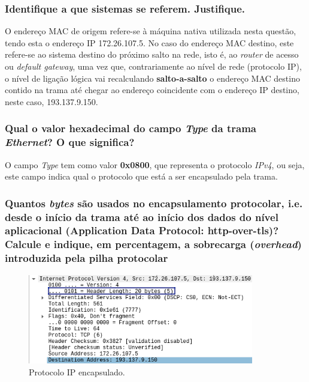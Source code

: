 \subsubsection{Identifique a que sistemas se referem. Justifique.}

    \par O endereço MAC de origem refere-se à máquina nativa utilizada nesta questão, tendo esta o endereço IP 172.26.107.5. No caso do endereço MAC destino, este refere-se ao sistema destino do próximo salto na rede, isto é, ao \textit{router} de acesso ou \textit{default gateway}, uma vez que, contrariamente ao nível de rede (protocolo IP), o nível de ligação lógica vai recalculando \textbf{salto-a-salto} o endereço MAC destino contido na trama até chegar ao endereço coincidente com o endereço IP destino, neste caso, 193.137.9.150.




\paragraph{}
\subsubsection{Qual o valor hexadecimal do campo \textit{Type} da trama \textit{Ethernet}? O que significa?}

    \par O campo \textit{Type} tem como valor \textbf{0x0800}, que representa o protocolo \textit{IPv4}, ou seja, este campo indica qual o protocolo que está a ser encapsulado pela trama.




\subsubsection{Quantos \textit{bytes} são usados no encapsulamento protocolar, i.e. desde o início da trama até ao início dos dados do nível aplicacional (Application Data Protocol: http-over-tls)? Calcule e indique, em percentagem, a sobrecarga (\textit{overhead})
introduzida pela pilha protocolar}

    \begin{figure}[H]
    \centering
    \includegraphics[width=280pt]{prints/Questao3/questao3-IP.png}
    \caption{Protocolo IP encapsulado.} \label{questao3-d-IP}
    \end{figure}
    
